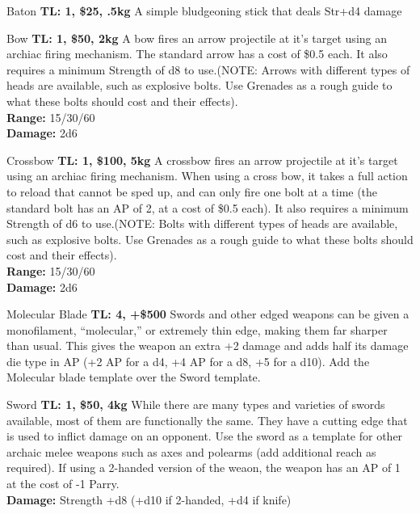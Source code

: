 \begin{multicols}{2}

\begin{genericsection}{Baton}
\textbf{TL: 1, \$25, .5kg}
A simple bludgeoning stick that deals Str+d4 damage
\end{genericsection}

\begin{genericsection}{Bow}
\textbf{TL: 1, \$50, 2kg}
A bow fires an arrow projectile at it's target using an archiac firing mechanism. The standard arrow has a cost of \$0.5 each. It also requires a minimum Strength of d8 to use.(NOTE: Arrows with different types of heads are available, such as explosive bolts. Use Grenades as a rough guide to what these bolts should cost and their effects).\\
\textbf{Range:} 15/30/60\\
\textbf{Damage:} 2d6
\end{genericsection}

\begin{genericsection}{Crossbow}
\textbf{TL: 1, \$100, 5kg}
A crossbow fires an arrow projectile at it's target using an archiac firing mechanism. When using a cross bow, it takes a full action to reload that cannot be sped up, and can only fire one bolt at a time (the standard bolt has an AP of 2, at a cost of \$0.5 each). It also requires a minimum Strength of d6 to use.(NOTE: Bolts with different types of heads are available, such as explosive bolts. Use Grenades as a rough guide to what these bolts should cost and their effects).\\
\textbf{Range:} 15/30/60\\
\textbf{Damage:} 2d6
\end{genericsection}

\begin{genericsection}{Molecular Blade}
\textbf{TL: 4, +\$500}
Swords and other edged weapons can be given a monofilament, “molecular,” or extremely thin edge, making them far sharper than usual. This gives the weapon an extra +2 damage and adds half its damage die type in AP (+2 AP for a d4, +4 AP for a d8, +5 for a d10). Add the Molecular blade template over the Sword template.
\end{genericsection}

\begin{genericsection}{Sword}
\textbf{TL: 1, \$50, 4kg}
While there are many types and varieties of swords available, most of them are functionally the same. They have a cutting edge that is used to inflict damage on an opponent. Use the sword as a template for other archaic melee weapons such as axes and polearms (add additional reach as required). If using a 2-handed version of the weaon, the weapon has an AP of 1 at the cost of -1 Parry.\\
\textbf{Damage:} Strength +d8 (+d10 if 2-handed, +d4 if knife)
\end{genericsection}

\end{multicols}

